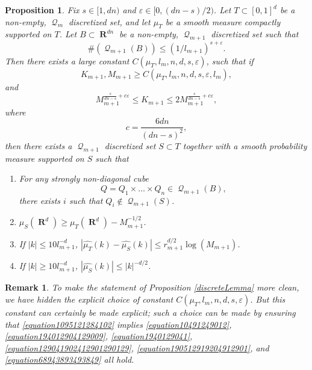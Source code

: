 \documentclass[12pt,reqno]{article}
\numberwithin{equation}{section}
\DeclareMathOperator{\RR}{\mathbf{R}}
\newtheorem{prop}[theorem]{Proposition}
\newtheorem{remark}[theorem]{Remark}
\DeclareMathOperator{\DQ}{\mathcal{Q}}
\begin{document}
\begin{prop} \label{discreteLemma}
    Fix $s \in [1,dn)$ and $\varepsilon \in [0,(dn-s)/2)$. Let $T \subset [0,1]^d$ be a non-empty, $\DQ_m$ discretized set, and let $\mu_T$ be a smooth measure compactly supported on $T$. Let $B \subset \RR^{dn}$ be a non-empty, $\DQ_{m+1}$ discretized set such that
    \begin{equation} \label{equation1290419204912090120912}
       \#(\DQ_{m+1}(B)) \leq (1/l_{m+1})^{s + \varepsilon}.
    \end{equation}
    Then there exists a large constant $C(\mu_T,l_m,n,d,s,\varepsilon)$, such that if
    \begin{equation} \label{equation1095121284102}
        K_{m+1}, M_{m+1} \geq C(\mu_T,l_m,n,d,s,\varepsilon,l_m),
    \end{equation}
    and
    \begin{equation} \label{equation5890129048128941891}
        M_{m+1}^{\frac{s}{dn-s} + c\varepsilon} \leq K_{m+1} \leq 2 M_{m+1}^{\frac{s}{dn-s} + c \varepsilon},
    \end{equation}
    where
    \[ c = \frac{6dn}{(dn - s)^2}, \]
    then there exists a $\DQ_{m+1}$ discretized set $S \subset T$ together with a smooth probability measure supported on $S$ such that
    \begin{enumerate}
        \item[(A)] For any strongly non-diagonal cube
        \[ Q = Q_1 \times \dots \times Q_n \in \DQ_{m+1}(B), \]
        there exists $i$ such that $Q_i \not \in \DQ_{m+1}(S)$.

        \item[(B)] $\mu_S(\RR^d) \geq \mu_T(\RR^d) - M_{m+1}^{-1/2}$.

        \item[(C)] If $|k| \leq 10 l_{m+1}^{-d}$, $|\widehat{\mu_T}(k) - \widehat{\mu_S}(k)| \leq r_{m+1}^{d/2} \log(M_{m+1})$.

        \item[(D)] If $|k| \geq 10 l_{m+1}^{-d}$, $|\widehat{\mu_S}(k)| \leq |k|^{-d/2}$.
    \end{enumerate}
\end{prop}

\begin{remark}
    To make the statement of Proposition \eqref{discreteLemma} more clean, we have hidden the explicit choice of constant $C(\mu_T,l_m,n,d,s,\varepsilon)$. But this constant can certainly be made explicit; such a choice can be made by ensuring that \eqref{equation1095121284102} implies \eqref{equation10491249012}, \eqref{equation194012904129009}, \eqref{equation1940129041}, \eqref{equation129041902412901290129}, \eqref{equation190512919204912901}, and \eqref{equation68943893493849} all hold.%
\end{remark}
\end{document}
